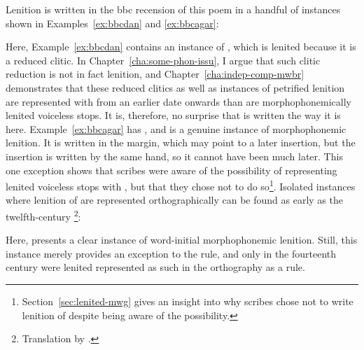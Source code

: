 Lenition is written in the \gls{bbc} recension of this poem in a handful of instances shown in Examples~\ref{ex:bbcdan} and \ref{ex:bbcagar}:
\begin{mwl}
\end{mwl}
Here, Example~\ref{ex:bbcdan} contains an instance of , which is lenited because it is a reduced clitic. In Chapter~\ref{cha:some-phon-issu}, I argue that such clitic reduction is not in fact lenition, and Chapter~\ref{cha:indep-comp-mwbr} demonstrates that these reduced clitics as well as instances of petrified lenition are represented with  from an earlier date onwards than are morphophonemically lenited voiceless stops. It is, therefore, no surprise that  is written the way it is here. Example~\ref{ex:bbcagar} has , and is a genuine instance of morphophonemic lenition. It is written in the margin, which may point to a later insertion, but the insertion is written by the same hand, so it cannot have been much later. This one exception shows that scribes were aware of the possibility of representing lenited voiceless stops with , but that they chose not to do so\footnote{Section~\ref{sec:lenited-mwg} gives an insight into why scribes chose not to write lenition of  despite being aware of the possibility.}. Isolated instances where lenition of  are represented orthographically can be found as early as the twelfth-century \footnote{Translation by \textcite[136]{davies_braint_1974}.}:
\begin{mwl}
\end{mwl}
Here,   presents a clear instance of word-initial morphophonemic lenition. Still, this instance merely  provides an exception to the rule, and only in the fourteenth century  were lenited   represented as such in the orthography as a rule.

